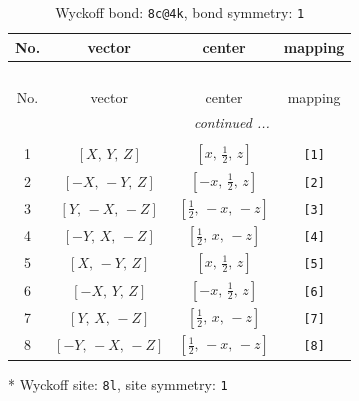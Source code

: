 \documentclass[fleqn,8pt]{jsarticle}
\begin{document}
\renewcommand{\arraystretch}{1.2}
\begin{longtable}{cccc}
\caption{Wyckoff bond: {\tt 8c@4k}, bond symmetry: {\tt 1}}
 \\
 \hline \hline
No. & vector & center & mapping \\ \hline \endfirsthead

\multicolumn{3}{l}{\tablename\ \thetable{}} \\
 \hline \hline
No. & vector & center & mapping \\ \hline \endhead

 \hline \hline
\multicolumn{3}{r}{\footnotesize\it continued ...} \\ \endfoot

 \hline \hline
\multicolumn{3}{r}{} \\ \endlastfoot

1 & $\left[ X,\, Y,\, Z \right]$ & $\left[ x,\, \frac{1}{2},\, z \right]$ & {\tt [1]} \\ \hline
2 & $\left[ - X,\, - Y,\, Z \right]$ & $\left[ - x,\, \frac{1}{2},\, z \right]$ & {\tt [2]} \\ \hline
3 & $\left[ Y,\, - X,\, - Z \right]$ & $\left[ \frac{1}{2},\, - x,\, - z \right]$ & {\tt [3]} \\ \hline
4 & $\left[ - Y,\, X,\, - Z \right]$ & $\left[ \frac{1}{2},\, x,\, - z \right]$ & {\tt [4]} \\ \hline
5 & $\left[ X,\, - Y,\, Z \right]$ & $\left[ x,\, \frac{1}{2},\, z \right]$ & {\tt [5]} \\ \hline
6 & $\left[ - X,\, Y,\, Z \right]$ & $\left[ - x,\, \frac{1}{2},\, z \right]$ & {\tt [6]} \\ \hline
7 & $\left[ Y,\, X,\, - Z \right]$ & $\left[ \frac{1}{2},\, x,\, - z \right]$ & {\tt [7]} \\ \hline
8 & $\left[ - Y,\, - X,\, - Z \right]$ & $\left[ \frac{1}{2},\, - x,\, - z \right]$ & {\tt [8]} \\
\end{longtable}
* Wyckoff site: {\tt 8l}, site symmetry: {\tt 1}
\renewcommand{\arraystretch}{1.2}
\end{document}
